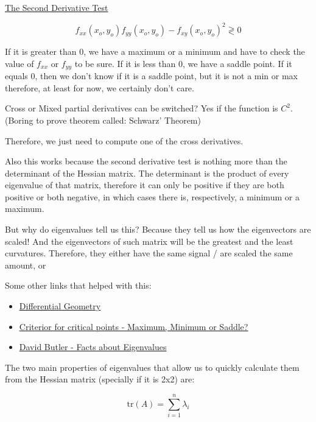 \ul{The Second Derivative Test}

\begin{equation}
    f_{xx}(x_o, y_o) f_{yy}(x_o, y_o) - f_{xy}(x_o, y_o)^2 \gtrless 0
\end{equation}

If it is greater than 0, we have a maximum or a minimum and have to check the value of $f_{xx}$ or $f_{yy}$ to be sure. If it is less than 0, we have a saddle point. If it equals 0, then we don't know if it is a saddle point, but it is not a min or max therefore, at least for now, we certainly don't care.

Cross or Mixed partial derivatives can be switched? Yes if the function is $C^2$. 
(Boring to prove theorem called: Schwarz' Theorem)

Therefore, we just need to compute one of the cross derivatives.


Also this works because the second derivative test is nothing more than the determinant of the Hessian matrix. The determinant is the product of every eigenvalue of that matrix, therefore it can only be positive if they are both positive or both negative, in which cases there is, respectively, a minimum or a maximum. 

But why do eigenvalues tell us this? Because they tell us how the eigenvectors are scaled! And the eigenvectors of such matrix will be the greatest and the least curvatures. Therefore, they either have the same signal / are scaled the same amount, or 



Some other links that helped with this:
\begin{itemize}
    \item \href{http://homepages.inf.ed.ac.uk/rbf/CVonline/LOCAL_COPIES/MORSE/diffgeom.pdf}{\ul{Differential Geometry}}
    \item \href{http://math.mit.edu/classes/18.013A/HTML/chapter11/section02.html}{\ul{Criterior for critical points - Maximum, Minimum or Saddle?}}
    \item \href{https://www.adelaide.edu.au/mathslearning/play/seminars/evalue-magic-tricks-handout.pdf}{David Butler - Facts about Eigenvalues}
\end{itemize}


The two main properties of eigenvalues that allow us to quickly calculate them from the Hessian matrix (specially if it is 2x2) are:

\begin{equation}
    \text{tr}(A) = \sum^n_{i = 1} \lambda_i    
\end{equation}

